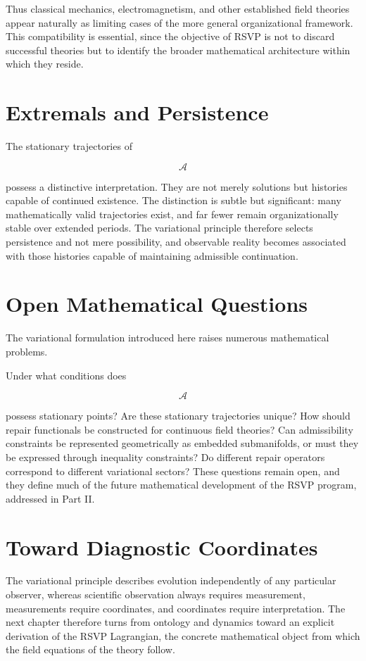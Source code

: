 \documentclass[11pt,oneside]{book}
\numberwithin{equation}{chapter}
\theoremstyle{definition}
\theoremstyle{plain}
\begin{document}
Thus classical mechanics, electromagnetism, and other established field theories appear naturally as limiting cases of the more general organizational framework. This compatibility is essential, since the objective of RSVP is not to discard successful theories but to identify the broader mathematical architecture within which they reside.

\section{Extremals and Persistence}

The stationary trajectories of

\[
\mathcal A
\]

possess a distinctive interpretation. They are not merely solutions but histories capable of continued existence. The distinction is subtle but significant: many mathematically valid trajectories exist, and far fewer remain organizationally stable over extended periods. The variational principle therefore selects persistence and not mere possibility, and observable reality becomes associated with those histories capable of maintaining admissible continuation.

\section{Open Mathematical Questions}

The variational formulation introduced here raises numerous mathematical
problems.

Under what conditions does

\[
\mathcal A
\]

possess stationary points? Are these stationary trajectories unique? How should repair functionals be constructed for continuous field theories? Can admissibility constraints be represented geometrically as embedded submanifolds, or must they be expressed through inequality constraints? Do different repair operators correspond to different variational sectors? These questions remain open, and they define much of the future mathematical development of the RSVP program, addressed in Part II.

\section{Toward Diagnostic Coordinates}

The variational principle describes evolution independently of any particular observer, whereas scientific observation always requires measurement, measurements require coordinates, and coordinates require interpretation. The next chapter therefore turns from ontology and dynamics toward an explicit derivation of the RSVP Lagrangian, the concrete mathematical object from which the field equations of the theory follow.
\end{document}
